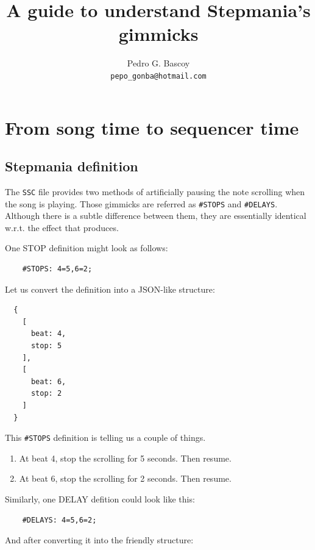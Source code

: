 \documentclass[a4paper,9pt]{article}
\begin{document}
    
    \title{A guide to understand Stepmania's gimmicks}
    \author{
        Pedro G. Bascoy\\
        \texttt{pepo\_gonba@hotmail.com}\\
    }
    \maketitle

   
    \section{From song time to sequencer time}\label{sec:songtime2seqtime}
    \subsection{Stepmania definition}

    The \texttt{SSC} file provides two methods of artificially pausing the note scrolling when the song is playing. Those gimmicks are referred as \texttt{\#STOPS} and \texttt{\#DELAYS}. Although there is a subtle difference between them, they are essentially identical w.r.t. the effect that produces.

One STOP definition might look as follows:

\begin{verbatim}
    #STOPS: 4=5,6=2;
\end{verbatim}

Let us convert the definition into a JSON-like structure:

    \begin{verbatim}
  {
    [
      beat: 4,
      stop: 5 
    ],
    [
      beat: 6,
      stop: 2 
    ]
  }
    \end{verbatim}

    This \texttt{\#STOPS} definition is telling us a couple of things.
    \begin{enumerate}
	    \item At beat 4, stop the scrolling for 5 seconds. Then resume.
	    \item At beat 6, stop the scrolling for 2 seconds. Then resume.
    \end{enumerate}

Similarly, one DELAY defition could look like this:
\begin{verbatim}
    #DELAYS: 4=5,6=2;
\end{verbatim}

And after converting it into the friendly structure:
\end{document}
